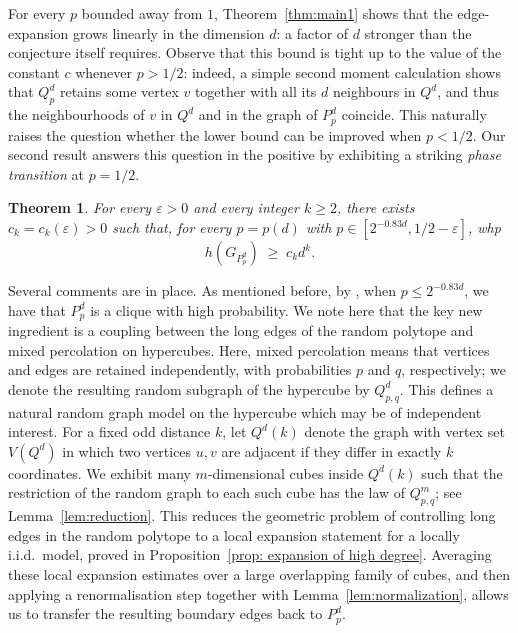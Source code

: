 \documentclass{article}
\newtheorem{theorem}{Theorem}
\theoremstyle{definition}
\newcommand{\eps}{\varepsilon}
\begin{document}
For every $p$ bounded away from $1$, Theorem~\ref{thm:main1} shows that the edge-expansion grows linearly
in the dimension $d$: a factor of $d$ stronger than the conjecture itself
requires. Observe that this bound is tight up to the value of the constant $c$ whenever $p>1/2$: 
indeed, a simple second moment calculation shows that $Q^d_p$ retains some vertex $v$ together with all its $d$ neighbours in $Q^d$,
and thus the neighbourhoods of $v$ in $Q^d$ and in the graph of $P^d_p$ coincide.
This naturally raises the question whether the lower bound can be improved when $p<1/2$. 
Our second result answers this question in the positive by exhibiting a striking \emph{phase transition} at $p = 1/2$.
 
\begin{theorem}\label{thm:main2}
For every $\eps > 0$ and every integer $k \ge 2$, there exists $c_k=c_k(\eps)>0$ such that, for every $p = p(d)$ with $p\in \left[2^{-0.83d},1/2-\eps\right]$, whp
  \[
    h(G_{P^d_p}) \;\ge\; c_k d^k.
  \]
\end{theorem}
Several comments are in place. As mentioned before, by \cite{BEF25}, when $p\le 2^{-0.83d}$, we have that $P^d_p$ is a clique with high probability. We note here that the key new ingredient is a coupling between
the long edges of the random polytope and mixed percolation on
hypercubes. Here, mixed percolation means that vertices and edges are retained
independently, with probabilities $p$ and $q$,
respectively; we denote the resulting random subgraph of the
hypercube by $Q^d_{p,q}$. This defines a natural random graph
model on the hypercube which may be of independent interest. For a fixed odd distance $k$, let
$Q^d(k)$ denote the graph with vertex set $V(Q^d)$ in which two
vertices $u,v$ are adjacent if they differ in exactly $k$
coordinates. We exhibit many $m$-dimensional cubes inside
$Q^d(k)$ such that the restriction of the random graph to each
such cube has the law of $Q^m_{p,q}$; see
Lemma~\ref{lem:reduction}. This reduces the geometric problem of
controlling long edges in the random polytope to a local
expansion statement for a locally i.i.d.\ model, proved in
Proposition~\ref{prop: expansion of high degree}. Averaging these
local expansion estimates over a large overlapping family of
cubes, and then applying a renormalisation step together with
Lemma~\ref{lem:normalization}, allows us to transfer the resulting
boundary edges back to $P_p^d$.
\end{document}
